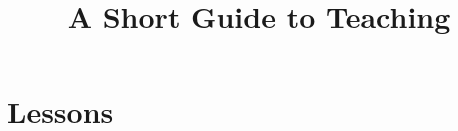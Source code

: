 \documentclass[11pt]{memoir}
\title{A Short Guide to Teaching}
\date{}
\begin{document}
\maketitle
\newpage
\tableofcontents



\part{Lessons}






% 
% 
% 
% 
% 
% 
% 
% 




% 
% 
% 
% 
\end{document}
